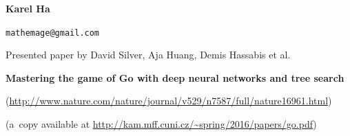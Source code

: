 \documentclass[a4paper,10pt]{article}
\begin{document}
\def\speaker#1#2{                                   
  \centerline{\Large \textbf{#1}}\vskip1pt                
  \centerline{\tt #2} }                                                                          
\def\title#1{\medskip\centerline{\Large \textbf{#1}}}
\def\author#1{\smallskip\centerline{Presented paper by #1}}                                                       
\def\source#1{\smallskip\centerline{(#1)}}
\def\endtitle{\par\medskip}
\newenvironment{definition}{\stepcounter{Defnum}\par\textbf{Definition \arabic{Defnum}.}} {}
\newenvironment{theorem}{\stepcounter{Defnum}\par\textbf{Theorem \arabic{Defnum}.}\it}{}
\newenvironment{lemma}{\stepcounter{Defnum}\par\textbf{Lemma \arabic{Defnum}.}\it}{}
\newenvironment{exercise}{\stepcounter{Defnum}\par\textbf{Exercise \arabic{Defnum}.}\it}{}
\newenvironment{observation}{\stepcounter{Defnum}\par\textbf{Observation \arabic{Defnum}.}\it}{}
\newenvironment{corollary}{\stepcounter{Defnum}\par\textbf{Corollary \arabic{Defnum}.}\it}{}
\newenvironment{conjecture}{\stepcounter{Defnum}\par\textbf{Conjecture \arabic{Defnum}.}\it}{}
\setlength{\parindent}{0pt}
\setlength{\parskip}{0.5 em}
\def\subsection#1{\par Not good idea. \smallskip}
\def\section#1{\par\medskip\centerline{\bf #1}\smallskip}
\def\cite#1{Don't use cite.}

\newcommand{\todo}{\textbf{TODO}}

\speaker{Karel Ha}{mathemage@gmail.com}
\author{David Silver, Aja Huang, Demis Hassabis et al.}%
\title{Mastering the game of Go with deep neural networks and tree search}
\source{\url{http://www.nature.com/nature/journal/v529/n7587/full/nature16961.html}}
\source{a~copy available at \url{http://kam.mff.cuni.cz/~spring/2016/papers/go.pdf}}
\endtitle
\end{document}
